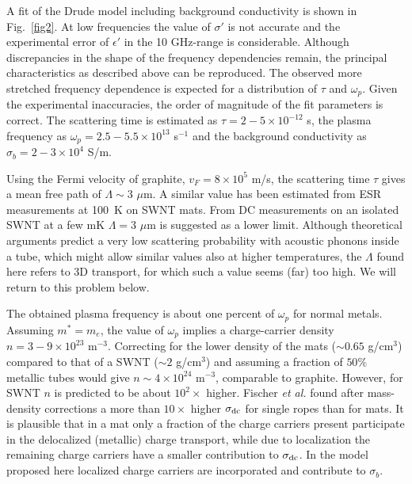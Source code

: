 \begin{multicols}{2}
A fit of the Drude model including background conductivity is shown
in Fig.~\ref{fig2}. At low frequencies the value of $\sigma'$ is
not accurate and the experimental error of $\epsilon'$ in the 10
GHz-range is considerable. Although discrepancies in the shape of
the frequency dependencies remain, the principal characteristics as
described above can be reproduced. The observed more stretched
frequency dependence is expected for a distribution of $\tau$ and
$\omega_p$. Given the experimental inaccuracies, the order of magnitude of
the fit parameters is correct. The scattering time is estimated as $\tau = 2
- 5\times10^{-12}$ s, the plasma frequency as $\omega_p = 2.5 -
5.5\times10^{13}$ s$^{-1}$ and the background conductivity as
$\sigma_b = 2-3\times10^4$ S/m.

Using the Fermi velocity of graphite, $v_F = 8 \times 10^5$ m/s, the
scattering time $\tau$ gives a mean free path of $\Lambda \sim 3$ $\mu$m. A
similar value has been estimated from ESR measurements at 100~K on SWNT
mats\cite{Petit97}. From DC measurements on an isolated SWNT at a few mK
$\Lambda = 3$ $\mu$m is suggested as a lower limit\cite{Tans97}. Although
theoretical arguments\cite{Farajian99} predict
a very low scattering probability with acoustic phonons inside a tube, which
might allow similar values also at higher temperatures, the $\Lambda$ found
here refers to 3D transport, for which such a value seems (far) too high. We
will return to this problem below.

The obtained plasma frequency is about one percent of $\omega_p$ for normal
metals. Assuming $m^* = m_e$, the value of $\omega_p$
implies a charge-carrier density $n = 3 - 9 \times 10^{23}$
m$^{-3}$. Correcting for the lower density of the mats ($\sim 0.65$
g/cm$^3$) compared to that of a SWNT ($\sim 2$ g/cm$^3$) and
assuming a fraction of $50\%$ metallic tubes\cite{Petit97} would
give $n \sim 4 \times 10^{24}$ m$^{-3}$, comparable to graphite.
However, for SWNT $n$ is predicted to be about $10^2 \times$
higher\cite{Mintmire92}. Fischer {\sl et al.}\cite{Fischer97} found after
mass-density corrections a more than $10 \times$ higher
$\sigma_{\rm dc}$ for single ropes than for mats. It is
plausible that in a mat only a fraction of the charge carriers
present participate in the delocalized (metallic) charge transport, while due
to localization the remaining charge carriers have a
smaller contribution to $\sigma_{\rm dc}$\cite{Bezryadin98}. In the model
proposed here localized charge carriers are incorporated and contribute to
$\sigma_b$.


\end{multicols}
